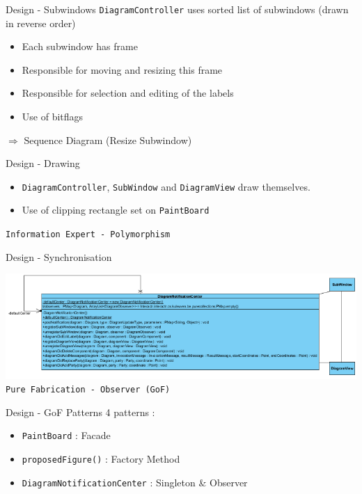 \documentclass[10pt]{beamer}
\begin{document}
\begin{frame}[fragile]{Design - Subwindows}
\texttt{DiagramController} uses sorted list of subwindows (drawn in reverse order)
\begin{itemize}
\item Each subwindow has frame
\item Responsible for moving and resizing this frame
\item Responsible for selection and editing of the labels
\item Use of bitflags
\end{itemize}
$\Rightarrow$ Sequence Diagram (Resize Subwindow) 
\begin{center}
\vspace{1cm}
\end{center}
\end{frame}

\begin{frame}[fragile]{Design - Drawing}
\begin{itemize}
\item \texttt{DiagramController}, \texttt{SubWindow} and \texttt{DiagramView} draw themselves.
\item Use of clipping rectangle set on \texttt{PaintBoard}
\end{itemize}
\begin{center}
\vspace{1cm}
\texttt{Information Expert - Polymorphism}
\end{center}
\end{frame}

\begin{frame}[fragile]{Design - Synchronisation}
\begin{center}
\includegraphics[width=1\textwidth]{notificationcenter}\\
\texttt{Pure Fabrication - Observer (GoF)}
\end{center}
\end{frame}

\begin{frame}[fragile]{Design - GoF Patterns}
4 patterns :
\begin{itemize}
\item \texttt{PaintBoard} : Facade
\item \texttt{proposedFigure()} : Factory Method
\item \texttt{DiagramNotificationCenter} : Singleton \& Observer
\end{itemize}
\end{frame}
\end{document}
